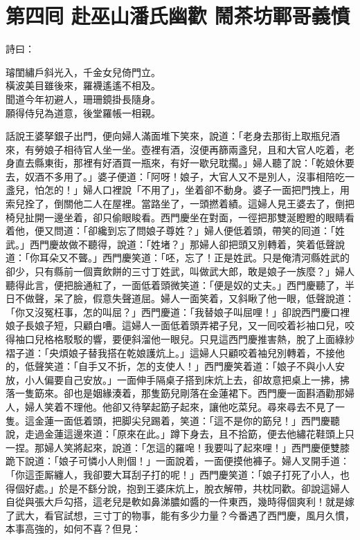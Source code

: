 
\chapter*{第四囘 赴巫山潘氏幽歡 鬧茶坊鄆哥義憤}


詩曰：

\begin{myquote} 
璿閨繡戶斜光入，千金女兒倚門立。\\橫波美目雖後來，羅襪遙遙不相及。\\聞道今年初避人，珊珊鏡掛長隨身。\\願得侍兒為道意，後堂羅帳一相親。
\end{myquote} 

話說王婆拏銀子出門，便向婦人滿面堆下笑來，說道：「老身去那街上取瓶兒酒來，有勞娘子相待官人坐一坐。壺裡有酒，沒便再篩兩盞兒，且和大官人吃着，老身直去縣東街，那裡有好酒買一瓶來，有好一歇兒耽擱。」{}婦人聽了說：「乾娘休要去，奴酒不多用了。」{}婆子便道：「阿呀！娘子，大官人又不是別人，{}沒事相陪吃一盞兒，怕怎的！」婦人口裡說「不用了」，坐着卻不動身。婆子一面把門拽上，用索兒拴了，倒關他二人在屋裡。當路坐了，一頭撚着績。這婦人見王婆去了，倒把椅兒扯開一邊坐着，{}卻只偷眼睃看。{}西門慶坐在對面，一徑把那雙涎瞪瞪的眼睛看着他，便又問道：「卻纔到忘了問娘子尊姓？」婦人便低着頭，帶笑的囘道：「姓武。」西門慶故做不聽得，說道：「姓堵？」那婦人卻把頭又別轉着，笑着低聲說道：「你耳朵又不聾。」西門慶笑道：「呸，忘了！正是姓武。只是俺清河縣姓武的卻少，只有縣前一個賣飲餅的三寸丁姓武，叫做武大郎，敢是娘子一族麼？」{}婦人聽得此言，便把臉通紅了，一面低着頭微笑道：「便是奴的丈夫。」西門慶聽了，半日不做聲，呆了臉，假意失聲道屈。婦人一面笑着，又斜瞅了他一眼，{}低聲說道：「你又沒冤枉事，怎的叫屈？」西門慶道：「我替娘子叫屈哩！」卻說西門慶口裡娘子長娘子短，只顧白嘈。這婦人一面低着頭弄裙子兒，又一囘咬着衫袖口兒，咬得袖口兒格格駁駁的響，要便斜溜他一眼兒。{}只見這西門慶推害熱，脫了上面綠紗褶子道：「央煩娘子替我搭在乾娘護炕上。」這婦人只顧咬着袖兒別轉着，不接他的，低聲笑道：「自手又不折，怎的支使人！」{}西門慶笑着道：「娘子不與小人安放，小人偏要自己安放。」一面伸手隔桌子搭到床炕上去，卻故意把桌上一拂，拂落一隻筯來。卻也是姻緣湊着，那隻筯兒剛落在金蓮裙下。西門慶一面斟酒勸那婦人，婦人笑着不理他。他卻又待拏起筯子起來，讓他吃菜兒。尋來尋去不見了一隻。這金蓮一面低着頭，把脚尖兒踢着，笑道：「這不是你的筯兒！」西門慶聽說，走過金蓮這邊來道：「原來在此。」蹲下身去，且不拾筯，便去他繡花鞋頭上只一捏。那婦人笑將起來，說道：「怎這的羅唣！我要叫了起來哩！」西門慶便雙膝跪下說道：「娘子可憐小人則個！」一面說着，一面便摸他褲子。婦人叉開手道：「你這歪厮纏人，我卻要大耳刮子打的呢！」西門慶笑道：「娘子打死了小人，也得個好處。」於是不繇分說，抱到王婆床炕上，脫衣解帶，共枕同歡。卻說這婦人自從與張大戶勾搭，這老兒是軟如鼻涕膿如醬的一件東西，幾時得個爽利！就是嫁了武大，看官試想，三寸丁的物事，能有多少力量？今番遇了西門慶，風月久慣，本事高強的，如何不喜？但見：

